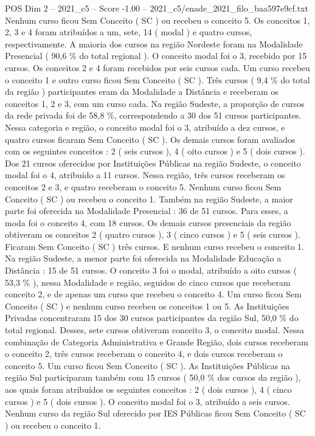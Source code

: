 \begin{textsample}{POS Dim 2 – 2021\_c5 – Score -1.00 – 2021\_c5/enade\_2021\_filo\_baa597e9cf.txt}
Nenhum curso ficou Sem Conceito ( SC ) ou recebeu o conceito 5.
Os conceitos 1, 2, 3 e 4 foram atribuídos a um, sete, 14 ( modal ) e quatro cursos, respectivamente.
A maioria dos cursos na região Nordeste foram na Modalidade Presencial ( 90,6 \% do total regional ).
O conceito modal foi o 3, recebido por 15 cursos.
Os conceitos 2 e 4 foram recebidos por seis cursos cada.
Um curso recebeu o conceito 1 e outro curso ficou Sem Conceito ( SC ).
Três cursos ( 9,4 \% do total da região ) participantes eram da Modalidade a Distância e receberam os conceitos 1, 2 e 3, com um curso cada.
Na região Sudeste, a proporção de cursos da rede privada foi de 58,8 \%, correspondendo a 30 dos 51 cursos participantes.
Nessa categoria e região, o conceito modal foi o 3, atribuído a dez cursos, e quatro cursos ficaram Sem Conceito ( SC ).
Os demais cursos foram avaliados com os seguintes conceitos : 2 ( seis cursos ), 4 ( oito cursos ) e 5 ( dois cursos ).
Dos 21 cursos oferecidos por Instituições Públicas na região Sudeste, o conceito modal foi o 4, atribuído a 11 cursos.
Nessa região, três cursos receberam os conceitos 2 e 3, e quatro receberam o conceito 5.
Nenhum curso ficou Sem Conceito ( SC ) ou recebeu o conceito 1.
Também na região Sudeste, a maior parte foi oferecida na Modalidade Presencial : 36 de 51 cursos.
Para esses, a moda foi o conceito 4, com 18 cursos.
Os demais cursos presenciais da região obtiveram os conceitos 2 ( quatro cursos ), 3 ( cinco cursos ) e 5 ( seis cursos ).
Ficaram Sem Conceito ( SC ) três cursos.
E nenhum curso recebeu o conceito 1.
Na região Sudeste, a menor parte foi oferecida na Modalidade Educação a Distância : 15 de 51 cursos.
O conceito 3 foi o modal, atribuído a oito cursos ( 53,3 \% ), nessa Modalidade e região, seguidos de cinco cursos que receberam conceito 2, e de apenas um curso que recebeu o conceito 4.
Um curso ficou Sem Conceito ( SC ) e nenhum curso recebeu os conceitos 1 ou 5.
As Instituições Privadas concentraram 15 dos 30 cursos participantes da região Sul, 50,0 \% do total regional.
Desses, sete cursos obtiveram conceito 3, o conceito modal.
Nessa combinação de Categoria Administrativa e Grande Região, dois cursos receberam o conceito 2, três cursos receberam o conceito 4, e dois cursos receberam o conceito 5.
Um curso ficou Sem Conceito ( SC ).
As Instituições Públicas na região Sul participaram também com 15 cursos ( 50,0 \% dos cursos da região ), aos quais foram atribuídos os seguintes conceitos : 2 ( dois cursos ), 4 ( cinco cursos ) e 5 ( dois cursos ).
O conceito modal foi o 3, atribuído a seis cursos.
Nenhum curso da região Sul oferecido por IES Públicas ficou Sem Conceito ( SC ) ou recebeu o conceito 1.

\end{textsample}
